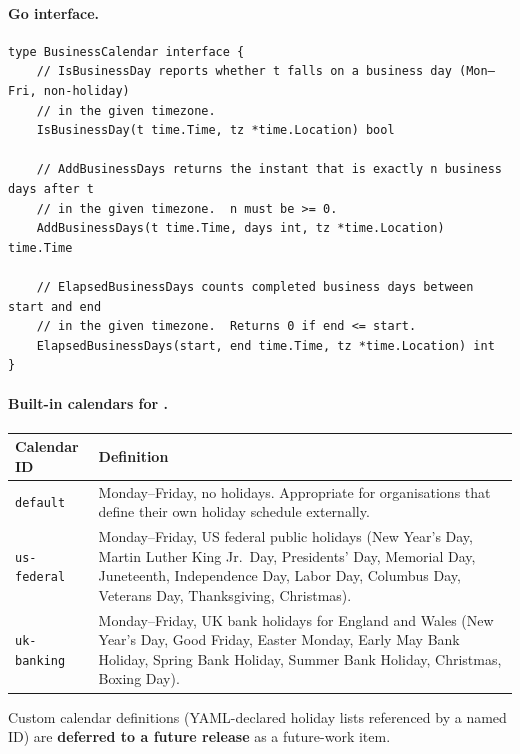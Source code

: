 \paragraph{Go interface.}

\begin{verbatim}
type BusinessCalendar interface {
    // IsBusinessDay reports whether t falls on a business day (Mon–Fri, non-holiday)
    // in the given timezone.
    IsBusinessDay(t time.Time, tz *time.Location) bool

    // AddBusinessDays returns the instant that is exactly n business days after t
    // in the given timezone.  n must be >= 0.
    AddBusinessDays(t time.Time, days int, tz *time.Location) time.Time

    // ElapsedBusinessDays counts completed business days between start and end
    // in the given timezone.  Returns 0 if end <= start.
    ElapsedBusinessDays(start, end time.Time, tz *time.Location) int
}
\end{verbatim}

\paragraph{Built-in calendars for .}

\begin{center}
\begin{tabular}{|l|p{9cm}|}
\hline
\textbf{Calendar ID} & \textbf{Definition} \\
\hline
\texttt{default}    & Monday–Friday, no holidays. Appropriate for organisations that
                      define their own holiday schedule externally. \\
\hline
\texttt{us-federal} & Monday–Friday, US federal public holidays (New Year's Day,
                      Martin Luther King Jr.\ Day, Presidents' Day, Memorial Day,
                      Juneteenth, Independence Day, Labor Day, Columbus Day,
                      Veterans Day, Thanksgiving, Christmas). \\
\hline
\texttt{uk-banking} & Monday–Friday, UK bank holidays for England and Wales
                      (New Year's Day, Good Friday, Easter Monday, Early May Bank
                      Holiday, Spring Bank Holiday, Summer Bank Holiday, Christmas,
                      Boxing Day). \\
\hline
\end{tabular}
\end{center}

Custom calendar definitions (YAML-declared holiday lists referenced by a named ID) are
\textbf{deferred to a future release} as a future-work item.

